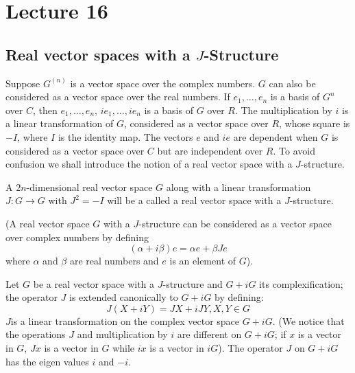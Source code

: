 \chapter{Lecture 16}

\section*{Real vector spaces with a $J$-Structure}\pageoriginale

Suppose $G^{(n)}$ is a vector space over the complex numbers. $G$ can
also be considered as a vector space over the real numbers. If
$e_{1},\ldots,e_{n}$ is a basis of $G^{n}$ over $C$, then
$e_{1},\ldots,e_{n}$, $ie_{1},\ldots,ie_{n}$ is a basis of $G$ over
$R$. The multiplication by $i$ is a linear transformation of $G$,
considered as a vector space over $R$, whose square is $-I$, where $I$
is the identity map. The vectors $e$ and $ie$ are dependent when $G$
is considered as a vector space over $C$ but are independent over
$R$. To avoid confusion we shall introduce the notion of a real vector
space with a $J$-structure.

A $2n$-dimensional real vector space $G$ along with a linear
transformation $J:G\to G$ with $J^{2}=-I$ will be a called a real
vector space with a $J$-structure.

(A real vector space $G$ with a $J$-structure can be considered as a
vector space over complex numbers by defining
$$
(\alpha+i\beta)e=\alpha e+\beta Je
$$
where $\alpha$ and $\beta$ are real numbers and $e$ is an element of
$G$).

Let $G$ be a real vector space with a $J$-structure and $G+iG$ its
complexification; the operator $J$ is extended canonically to $G+iG$
by defining:
$$
J(X+iY)=JX+iJY, X, Y\in G
$$
$J$\pageoriginale is a linear transformation on the complex vector
space $G+iG$. (We notice that the operations $J$ and multiplication by
$i$ are different on $G+iG$; if $x$ is a vector in $G$, $Jx$ is a
vector in $G$ while $ix$ is a vector in $iG$). The operator $J$ on
$G+iG$ has the eigen values $i$ and $-i$.

